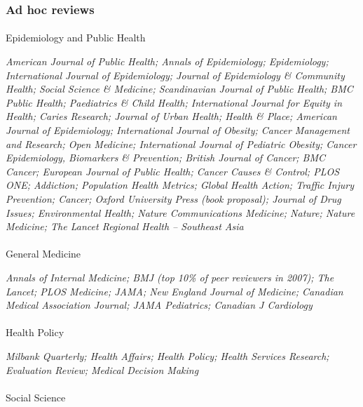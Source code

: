 \documentclass[
  letterpaper,
  DIV=11,
  numbers=noendperiod]{scrartcl}
\makeatletter
\let\oldparagraph\paragraph
\renewcommand{\paragraph}{
    \@ifstar
      \xxxParagraphStar
      \xxxParagraphNoStar
  }
\newcommand{\xxxParagraphStar}[1]{\oldparagraph*{#1}\mbox{}}
\newcommand{\xxxParagraphNoStar}[1]{\oldparagraph{#1}\mbox{}}
\makeatother
\begin{document}
\subsubsection{Ad hoc reviews}\label{ad-hoc-reviews}

\paragraph{Epidemiology and Public
Health}\label{epidemiology-and-public-health}

\emph{American Journal of Public Health; Annals of Epidemiology;
Epidemiology; International Journal of Epidemiology; Journal of
Epidemiology \& Community Health; Social Science \& Medicine;
Scandinavian Journal of Public Health; BMC Public Health; Paediatrics \&
Child Health; International Journal for Equity in Health; Caries
Research; Journal of Urban Health; Health \& Place; American Journal of
Epidemiology; International Journal of Obesity; Cancer Management and
Research; Open Medicine; International Journal of Pediatric Obesity;
Cancer Epidemiology, Biomarkers \& Prevention; British Journal of
Cancer; BMC Cancer; European Journal of Public Health; Cancer Causes \&
Control; PLOS ONE; Addiction; Population Health Metrics; Global Health
Action; Traffic Injury Prevention; Cancer; Oxford University Press (book
proposal); Journal of Drug Issues; Environmental Health; Nature
Communications Medicine; Nature; Nature Medicine; The Lancet Regional
Health -- Southeast Asia }

\paragraph{General Medicine}\label{general-medicine}

\emph{Annals of Internal Medicine; BMJ (top 10\% of peer reviewers in
2007); The Lancet; PLOS Medicine; JAMA; New England Journal of Medicine;
Canadian Medical Association Journal; JAMA Pediatrics; Canadian J
Cardiology}

\paragraph{Health Policy}\label{health-policy}

\emph{Milbank Quarterly; Health Affairs; Health Policy; Health Services
Research; Evaluation Review; Medical Decision Making}

\paragraph{Social Science}\label{social-science}
\end{document}
